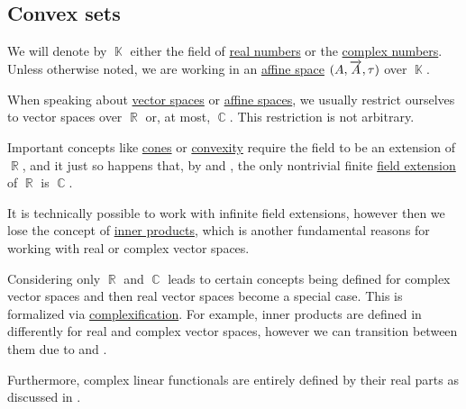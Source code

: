 \subsection{Convex sets}\label{subsec:convex_sets}

We will denote by \( \BbbK \) either the field of \hyperref[def:real_numbers]{real numbers} or the \hyperref[def:real_numbers]{complex numbers}. Unless otherwise noted, we are working in an \hyperref[def:affine_space]{affine space} \( (A, \overrightarrow{A}, \tau) \) over \( \BbbK \).

\begin{remark}\label{rem:real_field_extensions}
  When speaking about \hyperref[def:vector_space]{vector spaces} or \hyperref[def:affine_space]{affine spaces}, we usually restrict ourselves to vector spaces over \( \BbbR \) or, at most, \( \BbbC \). This restriction is not arbitrary.

  Important concepts like \hyperref[def:geometric_cone]{cones} or \hyperref[def:convex_hull]{convexity} require the field to be an extension of \( \BbbR \), and it just so happens that, by  and , the only nontrivial finite \hyperref[def:field/submodel]{field extension} of \( \BbbR \) is \( \BbbC \).

  It is technically possible to work with infinite field extensions, however then we lose the concept of \hyperref[def:inner_product_space]{inner products}, which is another fundamental reasons for working with real or complex vector spaces.

  Considering only \( \BbbR \) and \( \BbbC \) leads to certain concepts being defined for complex vector spaces and then real vector spaces become a special case. This is formalized via \hyperref[def:complexification]{complexification}. For example, inner products are defined in  differently for real and complex vector spaces, however we can transition between them due to  and .

  Furthermore, complex linear functionals are entirely defined by their real parts as discussed in .
\end{remark}

